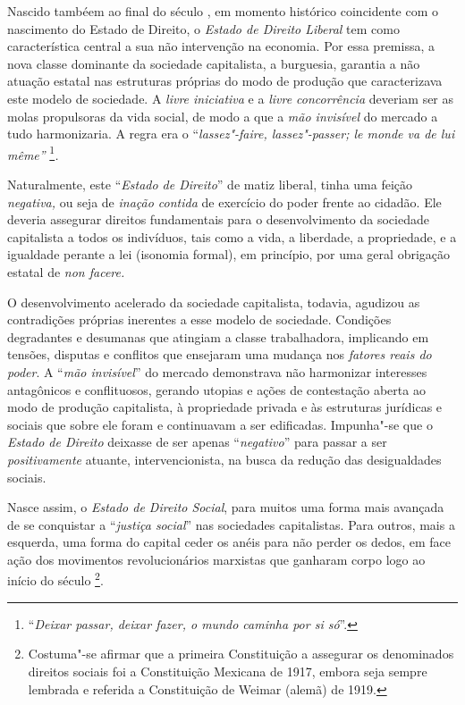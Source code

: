 Nascido tambéem ao final do século , em momento histórico
coincidente com o nascimento do Estado de Direito, o \emph{Estado de
Direito Liberal} tem como característica central a sua não intervenção
na economia. Por essa premissa, a nova classe dominante da sociedade
capitalista, a burguesia, garantia a não atuação estatal nas estruturas
próprias do modo de produção que caracterizava este modelo de sociedade.
A \emph{livre iniciativa} e a \emph{livre concorrência} deveriam ser as
molas propulsoras da vida social, de modo a que a \emph{mão invisível}
do mercado a tudo harmonizaria. A regra era o ``\emph{lassez"-faire,
lassez"-passer; le monde va de lui même''} \footnote{``\emph{Deixar
  passar, deixar fazer, o mundo caminha por si só}''.}\emph{.}

Naturalmente, este ``\emph{Estado de Direito}'' de matiz liberal, tinha
uma feição \emph{negativa,} ou seja de \emph{inação contida} de
exercício do poder frente ao cidadão. Ele deveria assegurar direitos
fundamentais para o desenvolvimento da sociedade capitalista a todos os
indivíduos, tais como a vida, a liberdade, a propriedade, e a igualdade
perante a lei (isonomia formal), em princípio, por uma geral obrigação
estatal de \emph{non facere.}

O desenvolvimento acelerado da sociedade capitalista, todavia, agudizou
as contradições próprias inerentes a esse modelo de sociedade. Condições
degradantes e desumanas que atingiam a classe trabalhadora, implicando
em tensões, disputas e conflitos que ensejaram uma mudança nos
\emph{fatores reais do poder}. A ``\emph{mão invisível}'' do mercado
demonstrava não harmonizar interesses antagônicos e conflituosos,
gerando utopias e ações de contestação aberta ao modo de produção
capitalista, à propriedade privada e às estruturas jurídicas e sociais
que sobre ele foram e continuavam a ser edificadas. Impunha"-se que o
\emph{Estado de Direito} deixasse de ser apenas ``\emph{negativo}'' para
passar a ser \emph{positivamente} atuante, intervencionista, na busca da
redução das desigualdades sociais.

Nasce assim, o \emph{Estado de Direito Social}, para muitos uma forma
mais avançada de se conquistar a ``\emph{justiça social}'' nas
sociedades capitalistas. Para outros, mais a esquerda, uma forma do
capital ceder os anéis para não perder os dedos, em face ação dos
movimentos revolucionários marxistas que ganharam corpo logo ao início
do século \footnote{Costuma"-se afirmar que a primeira Constituição a
  assegurar os denominados direitos sociais foi a Constituição Mexicana
  de 1917, embora seja sempre lembrada e referida a Constituição de
  Weimar (alemã) de 1919.}.

